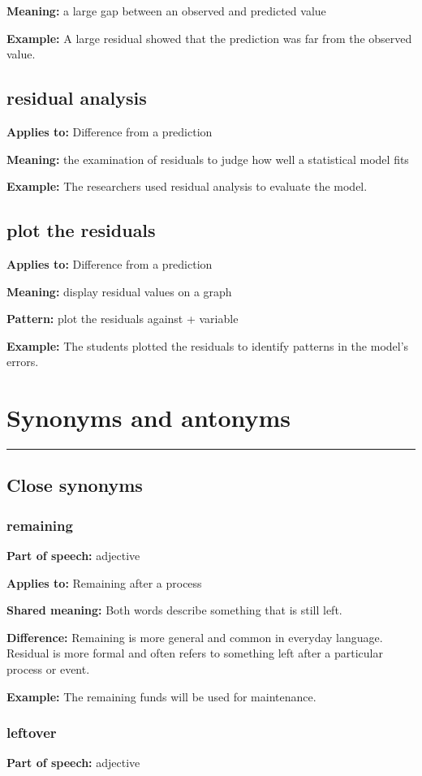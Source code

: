 \documentclass[11pt]{article}
\newcommand{\sectionrule}{\par\vspace{-0.5em}\noindent\textcolor{Accent}{\rule{\linewidth}{0.6pt}}\par}
\begin{document}
\textbf{Meaning:} a large gap between an observed and predicted value

\textbf{Example:} A large residual showed that the prediction was far from the observed value.

\subsection{residual analysis}
\textbf{Applies to:} Difference from a prediction

\textbf{Meaning:} the examination of residuals to judge how well a statistical model fits

\textbf{Example:} The researchers used residual analysis to evaluate the model.

\subsection{plot the residuals}
\textbf{Applies to:} Difference from a prediction

\textbf{Meaning:} display residual values on a graph

\textbf{Pattern:} plot the residuals against + variable

\textbf{Example:} The students plotted the residuals to identify patterns in the model's errors.

\section{Synonyms and antonyms}
\sectionrule
\subsection{Close synonyms}
\subsubsection{remaining}
\textbf{Part of speech:} adjective

\textbf{Applies to:} Remaining after a process

\textbf{Shared meaning:} Both words describe something that is still left.

\textbf{Difference:} Remaining is more general and common in everyday language. Residual is more formal and often refers to something left after a particular process or event.

\textbf{Example:} The remaining funds will be used for maintenance.

\subsubsection{leftover}
\textbf{Part of speech:} adjective
\end{document}
